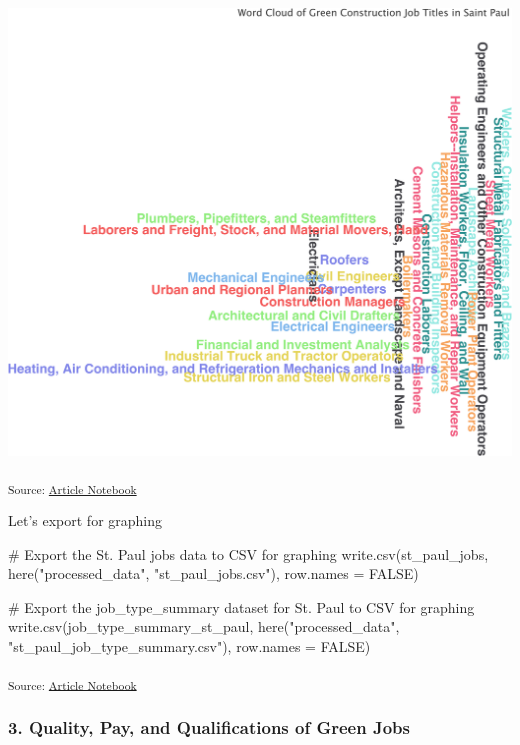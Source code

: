 \documentclass[
  letterpaper,
  DIV=11,
  numbers=noendperiod]{scrartcl}
\newenvironment{Shaded}{\begin{snugshade}}{\end{snugshade}}
\newcommand{\AttributeTok}[1]{\textcolor[rgb]{0.40,0.45,0.13}{#1}}
\newcommand{\CommentTok}[1]{\textcolor[rgb]{0.37,0.37,0.37}{#1}}
\newcommand{\ConstantTok}[1]{\textcolor[rgb]{0.56,0.35,0.01}{#1}}
\newcommand{\FunctionTok}[1]{\textcolor[rgb]{0.28,0.35,0.67}{#1}}
\newcommand{\NormalTok}[1]{\textcolor[rgb]{0.00,0.23,0.31}{#1}}
\newcommand{\StringTok}[1]{\textcolor[rgb]{0.13,0.47,0.30}{#1}}
\begin{document}
\includegraphics{index_files/figure-pdf/unnamed-chunk-23-3.pdf}

\textsubscript{Source:
\href{https://beeckcenter.github.io/climate-equity-workforce/index-preview.html}{Article
Notebook}}

Let's export for graphing

\begin{Shaded}
\begin{Highlighting}[]
\CommentTok{\# Export the St. Paul jobs data to CSV for graphing}
\FunctionTok{write.csv}\NormalTok{(st\_paul\_jobs, }\FunctionTok{here}\NormalTok{(}\StringTok{"processed\_data"}\NormalTok{, }\StringTok{"st\_paul\_jobs.csv"}\NormalTok{), }\AttributeTok{row.names =} \ConstantTok{FALSE}\NormalTok{)}

\CommentTok{\# Export the job\_type\_summary dataset for St. Paul to CSV for graphing}
\FunctionTok{write.csv}\NormalTok{(job\_type\_summary\_st\_paul, }\FunctionTok{here}\NormalTok{(}\StringTok{"processed\_data"}\NormalTok{, }\StringTok{"st\_paul\_job\_type\_summary.csv"}\NormalTok{), }\AttributeTok{row.names =} \ConstantTok{FALSE}\NormalTok{)}
\end{Highlighting}
\end{Shaded}

\textsubscript{Source:
\href{https://beeckcenter.github.io/climate-equity-workforce/index-preview.html}{Article
Notebook}}

\subsubsection{3. Quality, Pay, and Qualifications of Green
Jobs}\label{quality-pay-and-qualifications-of-green-jobs}
\end{document}
